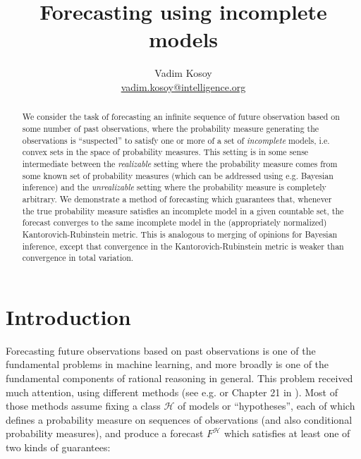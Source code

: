 \documentclass[11pt]{article}
\theoremstyle{definition}
\theoremstyle{plain}
\newcommand{\MC}{\mathcal{H}}
\begin{document}
\title{Forecasting using incomplete models}
\author{Vadim Kosoy \\ \href{mailto:vadim.kosoy@intelligence.org}{vadim.kosoy@intelligence.org}}
\date{}%
\maketitle

\begin{abstract}
We consider the task of forecasting an infinite sequence of future observation based on some number of past observations, where the probability measure generating the observations is \enquote{suspected} to satisfy one or more of a set of \emph{incomplete} models, i.e. convex sets in the space of probability measures. This setting is in some sense intermediate between the \emph{realizable} setting where the probability measure comes from some known set of probability measures (which can be addressed using e.g. Bayesian inference) and the \emph{unrealizable} setting where the probability measure is completely arbitrary. We demonstrate a method of forecasting which guarantees that, whenever the true probability measure satisfies an incomplete model in a given countable set, the forecast converges to the same incomplete model in the (appropriately normalized) Kantorovich-Rubinstein metric. This is analogous to merging of opinions for Bayesian inference, except that convergence in the Kantorovich-Rubinstein metric is weaker than convergence in total variation.
\end{abstract}


\section{Introduction}

Forecasting future observations based on past observations is one of the fundamental problems in machine learning, and more broadly is one of the fundamental components of rational reasoning in general. This problem received much attention, using different methods (see e.g. \cite{Cesa-Bianchi_2006} or Chapter 21 in \cite{Shalev-Shwartz_2014}). Most of those methods assume fixing a class $\MC$ of models or \enquote{hypotheses}, each of which defines a probability measure on sequences of observations (and also conditional probability measures), and produce a forecast $F^\MC$ which satisfies at least one of two kinds of guarantees:
\end{document}
